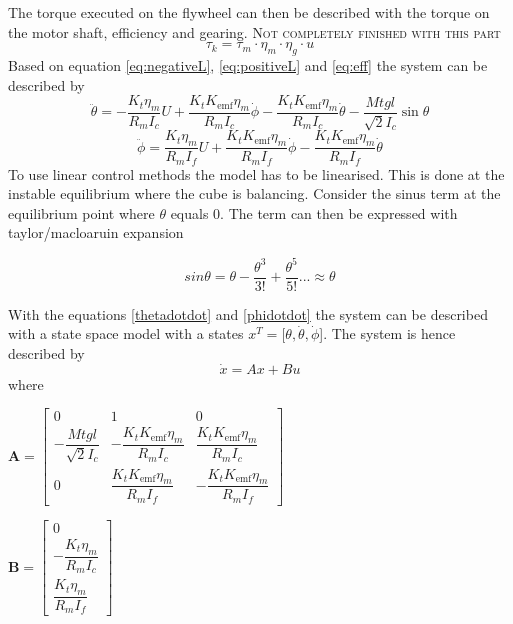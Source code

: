 \documentclass[a4paper,11pt]{kth-mag}
\begin{document}
The torque executed on the flywheel can then be described with the torque on the motor shaft, efficiency and gearing. \textsc{Not completely finished with this part}
\begin{equation} \label{eq:eff}
\tau_k = \tau_m \cdot \eta_m \cdot \eta_g \cdot u
\end{equation}
Based on equation \eqref{eq:negativeL}, \eqref{eq:positiveL} and \eqref{eq:eff} the system can be described by
\begin{equation}
\ddot{\theta} = -\frac{K_t \eta_m}{R_m I_c} U + \frac{K_t K_{\text{emf}} \eta_m}{R_m I_c} \dot{\phi} - \frac{K_t K_{\text{emf}} \eta_m}{R_m I_c} \dot{\theta} - \frac{Mt g l }{\sqrt{2} I_c} \sin \theta \label{thetadotdot}
\end{equation}
\begin{equation}
\ddot{\phi} = \frac{K_t \eta_m}{R_m I_f} U + \frac{K_t K_{\text{emf}} \eta_m}{R_m I_f} \dot{\phi} - \frac{K_t K_{\text{emf}} \eta_m}{R_m I_f} \dot{\theta} 
\label{phidotdot}
\end{equation} 
To use linear control methods the model has to be linearised. This is done at the instable equilibrium where the cube is balancing. Consider the sinus term at the equilibrium point where $\theta$ equals $0$. The term can then be expressed with taylor/macloaruin expansion

\begin{equation} \label{eq: sinus taylor}
sin \theta = \theta - \frac{\theta^3}{3!} +\frac{\theta^5}{5!}... \approx \theta 
\end{equation}

With the equations \eqref{thetadotdot} and \eqref{phidotdot} the system can be described with a state space model with a states $x^T = [\theta, \dot{\theta}, \dot{\phi}$]. The system is hence described by
\begin{equation}
\dot{x} = Ax + Bu
\end{equation} 
where \\
\begin{center}
$\textbf{A} =\begin{bmatrix}
0 & 1 & 0 \\
-\dfrac{Mt g l }{\sqrt{2} I_c} & - \dfrac{K_t K_{\text{emf}} \eta_m}{R_m I_c} & \dfrac{K_t K_{\text{emf}} \eta_m}{R_m I_c} \\ 
0 & \dfrac{K_t K_{\text{emf}} \eta_m}{R_m I_f} & -\dfrac{K_t K_{\text{emf}} \eta_m}{R_m I_f}
\end{bmatrix}$

$\textbf{B} = \begin{bmatrix}
0 \\ 
-\dfrac{K_t \eta_m}{R_m I_c} \\
\dfrac{K_t \eta_m}{R_m I_f}
\end{bmatrix} $
\end{center}
 
\end{document}
